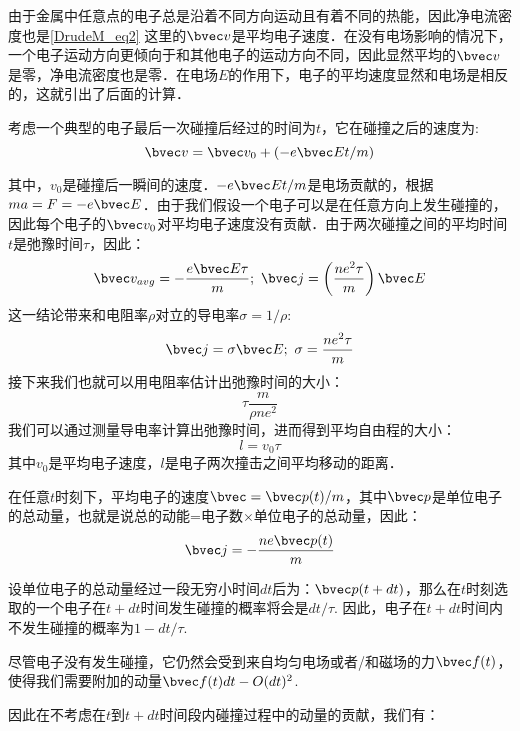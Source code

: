 由于金属中任意点的电子总是沿着不同方向运动且有着不同的热能，因此净电流密度也是\autoref{DrudeM_eq2} 这里的$\bvec v$是平均电子速度．在没有电场影响的情况下，一个电子运动方向更倾向于和其他电子的运动方向不同，因此显然平均的$\bvec v$是零，净电流密度也是零．在电场$E$的作用下，电子的平均速度显然和电场是相反的，这就引出了后面的计算．

考虑一个典型的电子最后一次碰撞后经过的时间为$t$，它在碰撞之后的速度为:
\begin{equation}
\bvec v = \bvec v_0 + (-e\bvec E t/m)
\end{equation}

其中，$v_0$是碰撞后一瞬间的速度．$-e\bvec E t/m$是电场贡献的，根据$ma = F = -e\bvec E$．由于我们假设一个电子可以是在任意方向上发生碰撞的，因此每个电子的$\bvec v_0$对平均电子速度没有贡献．由于两次碰撞之间的平均时间$t$是弛豫时间$\tau$，因此：
\begin{equation}
\bvec v_{avg} = -\frac{e\bvec E \tau}{m}; \ \bvec j =\left(\frac{ne^2\tau}{m}\right)\bvec E
\end{equation}
这一结论带来和电阻率$\rho$对立的导电率$\sigma = 1/\rho$:
\begin{equation}
\bvec j = \sigma \bvec E; \ \sigma = \frac{ne^2\tau}{m}
\end{equation}
接下来我们也就可以用电阻率估计出弛豫时间的大小：
\begin{equation}
\tau \frac{m}{\rho n e^2}
\end{equation}
我们可以通过测量导电率计算出弛豫时间，进而得到平均自由程的大小：
\begin{equation}
l=v_0\tau
\end{equation}
其中$v_0$是平均电子速度，$l$是电子两次撞击之间平均移动的距离．

在任意$t$时刻下，平均电子的速度$\bvec=\bvec p(t)/m$，其中$\bvec p$是单位电子的总动量，也就是说总的动能=电子数$\times$单位电子的总动量，因此：
\begin{equation}
\bvec j= -\frac{ne\bvec p(t)}{m}
\end{equation}

设单位电子的总动量经过一段无穷小时间$dt$后为：$\bvec p (t+dt)$，那么在$t$时刻选取的一个电子在$t+dt$时间发生碰撞的概率将会是$dt/\tau$. 因此，电子在$t+dt$时间内不发生碰撞的概率为$1-dt/\tau$.

尽管电子没有发生碰撞，它仍然会受到来自均匀电场或者/和磁场的力$\bvec f(t)$，使得我们需要附加的动量$\bvec f(t)dt - O(dt)^2$.

因此在不考虑在$t$到$t+dt$时间段内碰撞过程中的动量的贡献，我们有：


